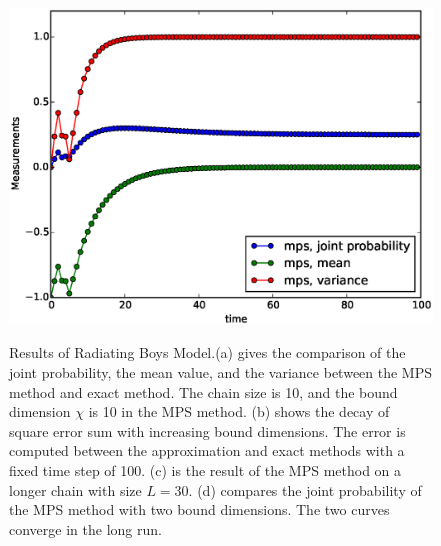 \begin{figure}[htbp]
{\includegraphics[scale=0.4]{Result_Fig/Radiating_MPS_t100_s30_bd10.eps}}\hfill
{}
  \caption{Results of Radiating Boys Model.(a) gives the comparison of the joint probability, the mean value, and the variance between the MPS method and exact method. The chain size is 10, and the bound dimension $\chi$ is 10 in the MPS method. (b) shows the decay of square error sum with increasing bound dimensions. The error is computed between the approximation and exact methods with a fixed time step of 100. (c) is the result of the MPS method on a longer chain with size $L=30$. (d) compares the joint probability of the MPS method with two bound dimensions. The two curves converge in the long run.}
  \label{fig:Radiating_result}
\end{figure}


